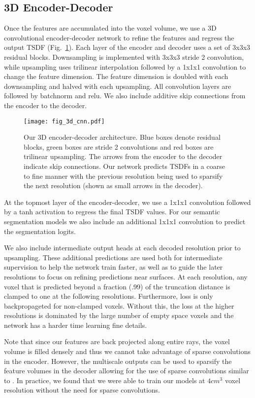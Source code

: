 \documentclass[runningheads]{llncs}
\begin{document}
\subsection{3D Encoder-Decoder}
Once the features are accumulated into the voxel volume, we use a 3D convolutional encoder-decoder network
to refine the features and regress the output TSDF (Fig.~\ref{fig:3dcnn}).
Each layer of the encoder and decoder uses a set of 3x3x3 residual blocks.
Downsampling is implemented with 3x3x3 stride 2 convolution,
while upsampling uses trilinear interpolation followed by a 1x1x1 convolution to change the feature dimension.
The feature dimension is doubled with each downsampling and halved with each upsampling.
All convolution layers are followed by batchnorm and relu.
We also include additive skip connections from the encoder to the decoder.

\begin{figure}
\centering
\texttt{[image: fig\_3d\_cnn.pdf]}
\caption{Our 3D encoder-decoder architecture. 
Blue boxes denote residual blocks,
green boxes are stride 2 convolutions and red boxes are trilinear upsampling.
The arrows from the encoder to the decoder indicate skip connections.
Our network predicts TSDFs in a coarse to fine manner with the previous resolution being used to sparsify the next resolution (shown as small arrows in the decoder).
}
\label{fig:3dcnn}
\end{figure}


At the topmost layer of the encoder-decoder, we use a 1x1x1 convolution followed by a tanh activation to regress the final TSDF values.
For our semantic segmentation models we also include an additional 1x1x1 convolution to predict the segmentation logits.

We also include intermediate output heads at each decoded resolution prior to upsampling.
These additional predictions are used both for intermediate supervision to help the network train faster,
as well as to guide the later resolutions to focus on refining predictions near surfaces.
At each resolution, any voxel that is predicted beyond a fraction (.99) of the truncation distance
is clamped to one at the following resolutions.
Furthermore, loss is only backpropageted for non-clamped voxels.
Without this, the loss at the higher resolutions is dominated by the large number of empty space voxels
and the network has a harder time learning fine details.

Note that since our features are back projected along entire rays, the voxel volume is filled densely and thus we cannot take advantage of sparse convolutions\cite{graham20183d} in the encoder.
However, the multiscale outputs can be used to sparsify the feature volumes in the decoder allowing for the use of sparse convolutions similar to \cite{dai2019sg}.
In practice, we found that we were able to train our models at $4cm^3$ voxel resolution without the need for sparse convolutions.
\end{document}
